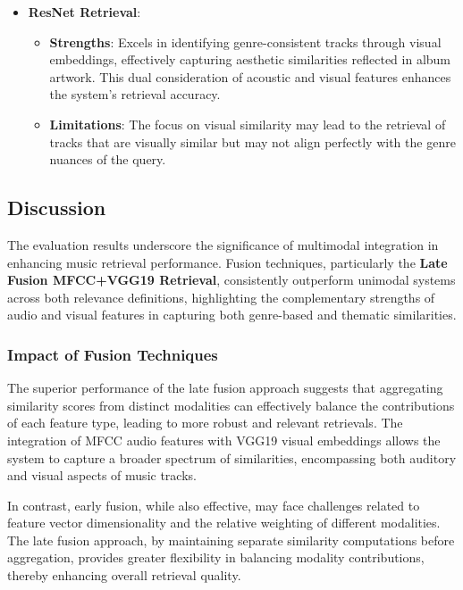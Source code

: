 \documentclass[sigconf]{acmart}
\begin{document}
\begin{itemize}
    \item \textbf{ResNet Retrieval}:
    \begin{itemize}
        \item \textbf{Strengths}: Excels in identifying genre-consistent tracks through visual embeddings, effectively capturing aesthetic similarities reflected in album artwork. This dual consideration of acoustic and visual features enhances the system's retrieval accuracy.
        \item \textbf{Limitations}: The focus on visual similarity may lead to the retrieval of tracks that are visually similar but may not align perfectly with the genre nuances of the query.
    \end{itemize}
\end{itemize}


\subsection{Discussion}
\label{subsec:discussion}

The evaluation results underscore the significance of multimodal integration in enhancing music retrieval performance. Fusion techniques, particularly the \textbf{Late Fusion MFCC+VGG19 Retrieval}, consistently outperform unimodal systems across both relevance definitions, highlighting the complementary strengths of audio and visual features in capturing both genre-based and thematic similarities.

\subsubsection{Impact of Fusion Techniques}

The superior performance of the late fusion approach suggests that aggregating similarity scores from distinct modalities can effectively balance the contributions of each feature type, leading to more robust and relevant retrievals. The integration of MFCC audio features with VGG19 visual embeddings allows the system to capture a broader spectrum of similarities, encompassing both auditory and visual aspects of music tracks.

In contrast, early fusion, while also effective, may face challenges related to feature vector dimensionality and the relative weighting of different modalities. The late fusion approach, by maintaining separate similarity computations before aggregation, provides greater flexibility in balancing modality contributions, thereby enhancing overall retrieval quality.
\end{document}
